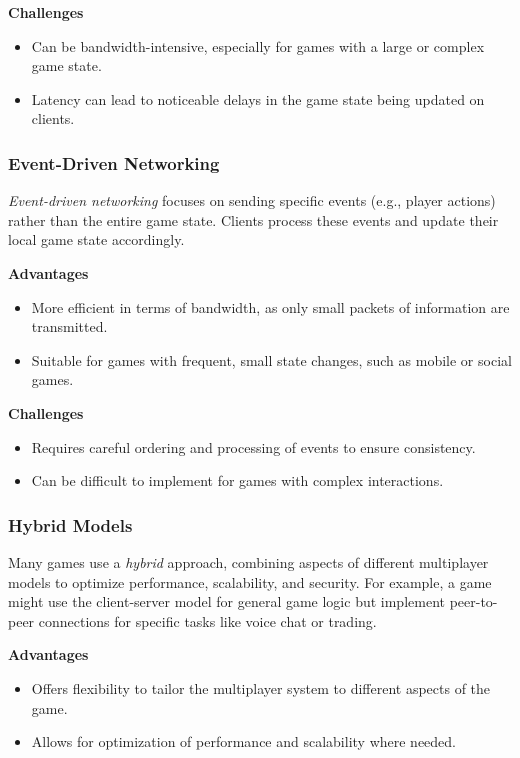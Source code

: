 \documentclass{article} %
\begin{document}
\textbf{Challenges}
\begin{itemize}
    \item Can be bandwidth-intensive, especially for games with a large or complex game state.
    \item Latency can lead to noticeable delays in the game state being updated on clients.
\end{itemize}

\subsubsection{Event-Driven Networking}
\textit{Event-driven networking} focuses on sending specific events (e.g., player actions) rather than the entire game state. Clients process these events and update their local game state accordingly.

\textbf{Advantages}
\begin{itemize}
    \item More efficient in terms of bandwidth, as only small packets of information are transmitted.
    \item Suitable for games with frequent, small state changes, such as mobile or social games.
\end{itemize}

\textbf{Challenges}
\begin{itemize}
    \item Requires careful ordering and processing of events to ensure consistency.
    \item Can be difficult to implement for games with complex interactions.
\end{itemize}

\subsubsection{Hybrid Models}
Many games use a \textit{hybrid} approach, combining aspects of different multiplayer models to optimize performance, scalability, and security. For example, a game might use the client-server model for general game logic but implement peer-to-peer connections for specific tasks like voice chat or trading.

\textbf{Advantages}
\begin{itemize}
    \item Offers flexibility to tailor the multiplayer system to different aspects of the game.
    \item Allows for optimization of performance and scalability where needed.
\end{itemize}
\end{document}
